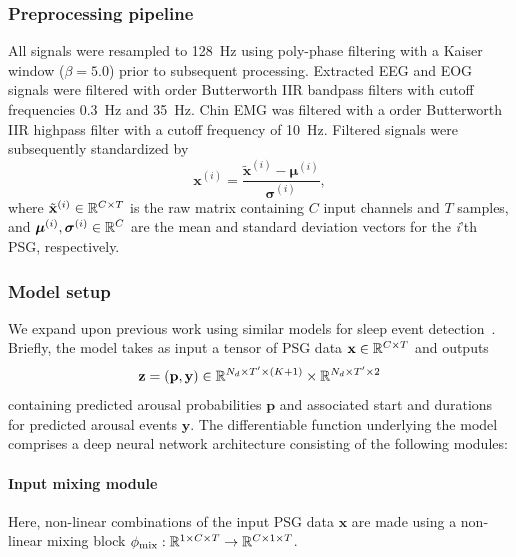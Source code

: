\subsubsection{Preprocessing pipeline}
All signals were resampled to \SI{128}{\hertz} using poly-phase filtering with a Kaiser window ($\beta = 5.0$) prior to subsequent processing.
Extracted EEG and EOG signals were filtered with  order Butterworth IIR bandpass filters with cutoff frequencies \SI{0.3}{\hertz} and \SI{35}{\hertz}. 
Chin EMG was filtered with a  order Butterworth IIR highpass filter with a cutoff frequency of \SI{10}{\hertz}.
Filtered signals were subsequently standardized by 
\begin{equation}
    \mathbf{x}^{(i)} = \frac{\tilde{\mathbf{x}}^{(i)} - \boldsymbol{\mu}^{(i)}}{\boldsymbol{\sigma}^{(i)}},
\end{equation}
where $\tilde{\mathbf{x}}^{(i)} \in \mathbb{R}^{C \times T}$ is the raw matrix containing $C$ input channels and $T$ samples, and $\boldsymbol{\mu}^{(i)}, \boldsymbol{\sigma}^{(i)} \in \mathbb{R}^{C}$ are the mean and standard deviation vectors for the \textit{i}'th PSG, respectively.

\subsubsection{Model setup}
We expand upon previous work using similar models for sleep event detection~\cite{Chambon2018b, Chambon2019, Olesen2019}. 
Briefly, the model takes as input a tensor of PSG data $\mathbf{x} \in \mathbb{R}^{C \times T}$ and outputs 
\begin{equation}
    \mathbf{z} = \left( \mathbf{p}, \mathbf{y} \right) \in \mathbb{R}^{N_d \times T^{\prime} \times (K+1)} \times \mathbb{R}^{N_d \times T^{\prime} \times 2}
\end{equation}
containing predicted arousal probabilities $\mathbf{p}$ and associated start and durations for predicted arousal events $\mathbf{y}$.
The differentiable function underlying the model comprises a deep neural network architecture consisting of the following modules:
\paragraph{Input mixing module}
Here, non-linear combinations of the input PSG data $\mathbf{x}$ are made using a non-linear mixing block $\phi_{\mathrm{mix}} : \mathbb{R}^{1 \times C \times T} \to \mathbb{R}^{C \times 1 \times T}$.
